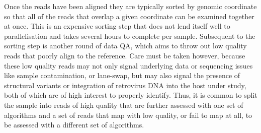 Once the reads have been aligned they are typically sorted by genomic coordinate so that all of the reads that overlap a given coordinate can be examined together at once. This is an expensive sorting step that does not lend itself well to parallelisation and takes several hours to complete per sample\autocite{barnett2011bamtools}. Subsequent to the sorting step is another round of data QA, which aims to throw out low quality reads that poorly align to the reference. Care must be taken however, because these low quality reads may not only signal underlying data or sequencing issues like sample contamination, or lane-swap, but may also signal the presence of structural variants or integration of retrovirus DNA into the host under study, both of which are of high interest to properly identify. Thus, it is common to split the sample into reads of high quality that are further assessed with one set of algorithms and a set of reads that map with low quality, or fail to map at all, to be assessed with a different set of algorithms.

